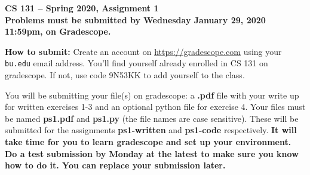\documentclass[11pt]{article}
\theoremstyle{definition}
\newcommand{\problemset}[2]{
  \begin{center}
  \Large{\textbf{CS 131 -- Spring 2020, Assignment #1}}\\
  \large{\textbf{Problems must be submitted by #2, on Gradescope.}}
  \end{center}
}
\begin{document}
\problemset{1}{Wednesday January 29, 2020 11:59pm}

\noindent \textbf{How to submit:}
Create an account on \url{https://gradescope.com} using your \texttt{bu.edu} email address. You'll find yourself already enrolled in CS 131 on gradescope. If not, use code 9N53KK to add yourself to the class.

You will be submitting your file(s) on gradescope: a \textbf{.pdf} file with your write up for written exercises 1-3 and an optional python file for exercise 4. Your files must be named \textbf{ps1.pdf} and \textbf{ps1.py} (the file names are case sensitive). These will be submitted for the assignments \textbf{ps1-written} and \textbf{ps1-code} respectively. \textbf{It will take time for you to learn gradescope and set up your environment. Do a test submission by Monday at the latest to make sure you know how to do it. You can replace your submission later.}
\end{document}
